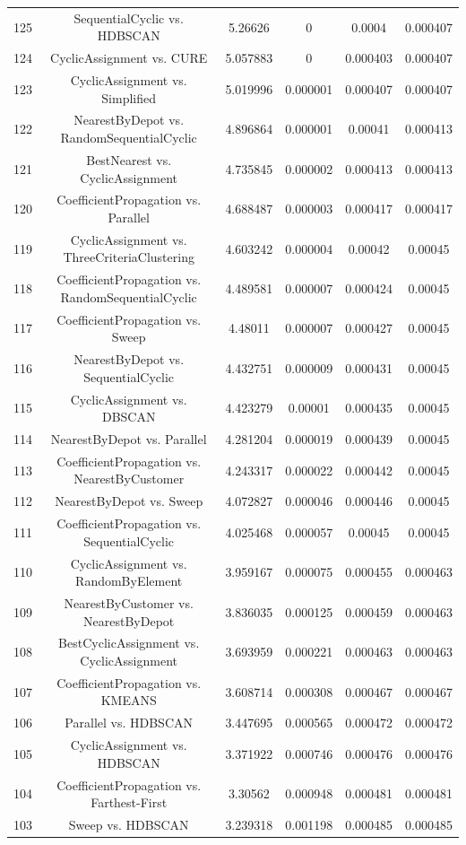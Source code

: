 \documentclass[a4paper,10pt]{article}
\begin{document}
\begin{landscape}
\begin{table}[!htp]
\begin{tabular}{cccccc}
125&SequentialCyclic vs. HDBSCAN&5.26626&0&0.0004&0.000407\\
124&CyclicAssignment vs. CURE&5.057883&0&0.000403&0.000407\\
123&CyclicAssignment vs. Simplified&5.019996&0.000001&0.000407&0.000407\\
122&NearestByDepot vs. RandomSequentialCyclic&4.896864&0.000001&0.00041&0.000413\\
121&BestNearest vs. CyclicAssignment&4.735845&0.000002&0.000413&0.000413\\
120&CoefficientPropagation vs. Parallel&4.688487&0.000003&0.000417&0.000417\\
119&CyclicAssignment vs. ThreeCriteriaClustering&4.603242&0.000004&0.00042&0.00045\\
118&CoefficientPropagation vs. RandomSequentialCyclic&4.489581&0.000007&0.000424&0.00045\\
117&CoefficientPropagation vs. Sweep&4.48011&0.000007&0.000427&0.00045\\
116&NearestByDepot vs. SequentialCyclic&4.432751&0.000009&0.000431&0.00045\\
115&CyclicAssignment vs. DBSCAN&4.423279&0.00001&0.000435&0.00045\\
114&NearestByDepot vs. Parallel&4.281204&0.000019&0.000439&0.00045\\
113&CoefficientPropagation vs. NearestByCustomer&4.243317&0.000022&0.000442&0.00045\\
112&NearestByDepot vs. Sweep&4.072827&0.000046&0.000446&0.00045\\
111&CoefficientPropagation vs. SequentialCyclic&4.025468&0.000057&0.00045&0.00045\\
110&CyclicAssignment vs. RandomByElement&3.959167&0.000075&0.000455&0.000463\\
109&NearestByCustomer vs. NearestByDepot&3.836035&0.000125&0.000459&0.000463\\
108&BestCyclicAssignment vs. CyclicAssignment&3.693959&0.000221&0.000463&0.000463\\
107&CoefficientPropagation vs. KMEANS&3.608714&0.000308&0.000467&0.000467\\
106&Parallel vs. HDBSCAN&3.447695&0.000565&0.000472&0.000472\\
105&CyclicAssignment vs. HDBSCAN&3.371922&0.000746&0.000476&0.000476\\
104&CoefficientPropagation vs. Farthest-First&3.30562&0.000948&0.000481&0.000481\\
103&Sweep vs. HDBSCAN&3.239318&0.001198&0.000485&0.000485\\

\end{tabular}
\end{table}
\end{landscape}
\end{document}
